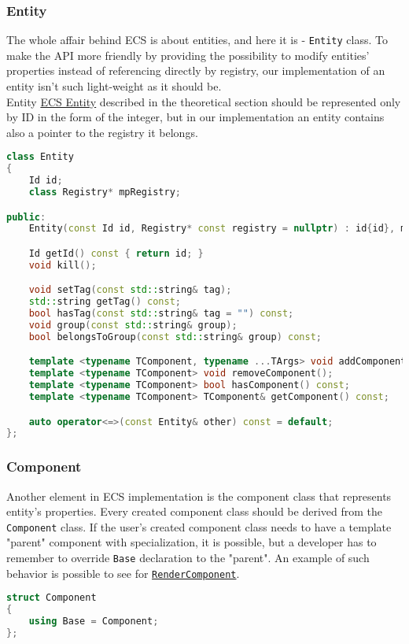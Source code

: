 \newpage

\subsubsection{Entity}
The whole affair behind ECS is about entities, and here it is - \texttt{Entity} class.
To make the API more friendly by providing the possibility to modify entities' properties instead of referencing directly by registry, our implementation of an entity isn't such light-weight as it should be.\\
Entity \hyperref[sec:registry]{ECS Entity} described in the theoretical section should be represented only by ID in the form of the integer, but in our implementation an entity contains also a pointer to the registry it belongs.
\begin{lstlisting}[language=c++, caption=Entity class (./engine/include/tsengine/ecs/ecs.h)]
class Entity
{
    Id id;
    class Registry* mpRegistry;

public:
    Entity(const Id id, Registry* const registry = nullptr) : id{id}, mpRegistry{registry} {}

    Id getId() const { return id; }
    void kill();

    void setTag(const std::string& tag);
    std::string getTag() const;
    bool hasTag(const std::string& tag = "") const;
    void group(const std::string& group);
    bool belongsToGroup(const std::string& group) const;

    template <typename TComponent, typename ...TArgs> void addComponent(TArgs&& ...args);
    template <typename TComponent> void removeComponent();
    template <typename TComponent> bool hasComponent() const;
    template <typename TComponent> TComponent& getComponent() const;

    auto operator<=>(const Entity& other) const = default;
};
\end{lstlisting}

\newpage

\subsubsection{Component}
Another element in ECS implementation is the component class that represents entity's properties.
Every created component class should be derived from the \texttt{Component} class. If the user's created component class needs to have a template "parent" component with specialization, it is possible, but a developer has to remember to override \texttt{Base} declaration to the "parent". An example of such behavior is possible to see for \hyperref[sec:render_component]{\texttt{RenderComponent}}.
\begin{lstlisting}[language=c++, caption=Component classe (./engine/include/tsengine/ecs/ecs.h)]
struct Component
{
    using Base = Component;
};
\end{lstlisting}

